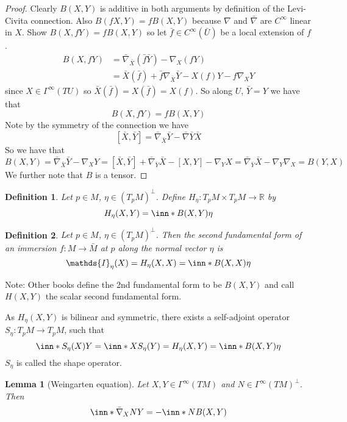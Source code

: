\documentclass[a4paper]{article}
\newtheorem*{defn}{Definition}
\newtheorem*{lem}{Lemma}
\begin{document}
\begin{proof}
  Clearly $B(X,Y)$ is additive in both arguments by definition of the Levi-Civita connection. Also $B(fX,Y) = fB(X,Y)$ because $\nabla$ and $\bar{\nabla}$ are $C^\infty$ linear in $X$. Show $B(X,fY) = fB(X,Y)$ so let $\bar{f} \in C^\infty(\bar{U})$ be a local extension of $f$. 
  \[
    \begin{aligned}
      B(X,fY) &= \bar{\nabla}_{\bar{X}} (\bar{f}\bar{Y}) - \nabla_X(fY) \\
              &= \bar{X} (\bar{f}) + \bar{f}\nabla_{\bar{X}}\bar{Y} - X(f) Y - f \nabla_X Y
    \end{aligned}
  \]
  since $X \in \Gamma^\infty(TU)$ so $\bar{X}(\bar{f}) = X(\bar{f}) = X(f)$. So along $U$, $\bar{Y} = Y$ we have that
  \[
    B(X,fY) = fB(X,Y)
  \]
  Note by the symmetry of the connection we have
  \[
    \left[ \bar{X}, \bar{Y} \right] = \bar{\nabla}_{\bar{X}}\bar{Y} - \bar{\nabla}{\bar{Y}}\bar{X}
  \]
  So we have that
  \[
    B(X,Y) = \bar{\nabla}_{\bar{X}}\bar{Y} - \nabla_X Y = \left[ \bar{X}, \bar{Y} \right] + \bar{\nabla}_{\bar{Y}}\bar{X} - [X,Y] - \nabla_Y X = \bar{\nabla}_{\bar{Y}}\bar{X} - \nabla_Y \nabla_X = B(Y,X)
  \]
  We further note that $B$ is a tensor.
\end{proof}

\begin{defn}
  Let $p \in M$, $\eta \in (T_pM)^\perp$. Define $H_\eta : T_pM \times T_pM \rightarrow \mathds{R}$ by
  \[
    H_\eta(X,Y) = \inn*{B(X,Y)}{\eta}
  \]
\end{defn}

\begin{defn}
  Let $p \in M$, $\eta \in (T_pM)^\perp$. Then the second fundamental form of an immersion $f:M \rightarrow \bar{M}$ at $p$ along the normal vector $\eta$ is
  \[
    \mathds{I}_\eta(X) = H_\eta(X,X) = \inn*{B(X,X)}{\eta}
  \]
\end{defn}
Note: Other books define the 2nd fundamental form to be $B(X,Y)$ and call $H(X,Y)$ the scalar second fundamental form.

As $H_\eta(X,Y)$ is bilinear and symmetric, there exists a self-adjoint operator $S_\eta: T_pM \rightarrow T_pM$, such that
\[
  \inn*{S_\eta(X)}{Y} = \inn*{X}{S_\eta(Y)} = H_\eta(X,Y) = \inn*{B(X,Y)}{\eta}
\]
$S_\eta$ is called the shape operator.

\begin{lem}[Weingarten equation]
  Let $X,Y \in \Gamma^\infty(TM)$ and $N \in \Gamma^\infty(TM)^\perp$. Then 
  \[
    \inn*{\bar{\nabla}_X N}{Y} = - \inn*{N}{B(X,Y)}
  \]
\end{lem}
\end{document}
